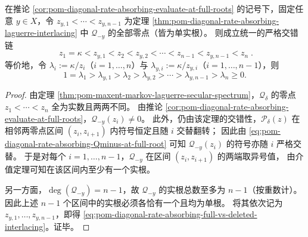\begin{theorem}[全谱与删点谱的严格交错链]\label{thm:pom-diagonal-rate-absorbing-full-vs-deleted-interlacing-secondary}
在推论 \ref{cor:pom-diagonal-rate-absorbing-evaluate-at-full-roots} 的记号下，固定任意 \(y\in X\)，令
\(
z_{y,1}<\cdots<z_{y,n-1}
\)
为定理 \ref{thm:pom-diagonal-rate-absorbing-laguerre-interlacing} 中 \(\mathcal Q_{-y}\) 的全部零点（皆为单实根）。
则成立统一的严格交错链
\begin{equation}\label{eq:pom-diagonal-rate-absorbing-full-vs-deleted-interlacing}
\boxed{\;
z_1=\kappa<z_{y,1}<z_2<z_{y,2}<\cdots<z_{n-1}<z_{y,n-1}<z_n\; } .
\end{equation}
等价地，令 \(\lambda_i:=\kappa/z_i\)（\(i=1,\dots,n\)）与 \(\lambda_{y,i}:=\kappa/z_{y,i}\)（\(i=1,\dots,n-1\)），则
\[
1=\lambda_1>\lambda_{y,1}>\lambda_2>\lambda_{y,2}>\cdots>\lambda_{y,n-1}>\lambda_n\ge 0.
\]
\end{theorem}
\begin{proof}
由定理 \ref{thm:pom-maxent-markov-laguerre-secular-spectrum}，\(\mathcal Q_\delta\) 的零点 \(z_1<\cdots<z_n\) 全为实数且两两不同。
由推论 \ref{cor:pom-diagonal-rate-absorbing-evaluate-at-full-roots}，\(\mathcal Q_{-y}(z_i)\ne 0\)。
此外，仍由该定理的交错性，\(\mathcal P_\delta(z)\) 在相邻两零点区间 \((z_i,z_{i+1})\) 内符号恒定且随 \(i\) 交替翻转；
因此由 \eqref{eq:pom-diagonal-rate-absorbing-Qminus-at-full-root} 可知 \(\mathcal Q_{-y}(z_i)\) 的符号亦随 \(i\) 严格交替。
于是对每个 \(i=1,\dots,n-1\)，\(\mathcal Q_{-y}\) 在区间 \((z_i,z_{i+1})\) 的两端取异号值，
由介值定理可知在该区间内至少有一个实根。
\par
另一方面，\(\deg(\mathcal Q_{-y})=n-1\)，故 \(\mathcal Q_{-y}\) 的实根总数至多为 \(n-1\)（按重数计）。
因此上述 \(n-1\) 个区间中的实根必须各恰有一个且均为单根。
将其依次记为 \(z_{y,1},\dots,z_{y,n-1}\)，即得 \eqref{eq:pom-diagonal-rate-absorbing-full-vs-deleted-interlacing}。证毕。
\end{proof}

\endinput

